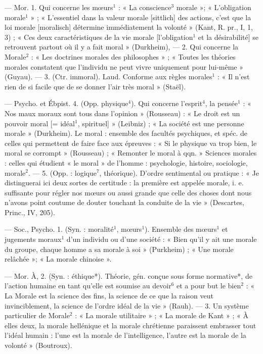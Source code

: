 \begin{itemize}[leftmargin=1cm, label=, itemsep=1pt]
 — Mor. 1. Qui concerne les
mœurs$^1$ : « La conscience$^3$ morale »;
« L'obligation morale$^1$ » ; « L’essentiel dans la valeur morale [sittlich]
des actions, c’est que la loi morale
[moralisch] détermine immédiatement la volonté » (Kant, R. pr., I,
1, 3) ; « Ces deux caractéristiques de
la vie morale [l’obligation$^1$ et la désirabilité] se retrouvent partout où il
y a fait moral » (Durkheim), — 2.
Qui concerne la Morale$^2$ : « Les doctrines morales des philosophes » ;
« Toutes les théories morales constatent que l'individu ne peut vivre
uniquement pour lui-même »
(Guyau). — 3. (Ctr. immoral).
Laud. Conforme aux règles morales$^1$ :
« Il n’est rien de si facile que de se
donner l'air très moral » (Staël).

— Psycho. et Ébpist. 4. (Opp.
physique$^4$). Qui concerne l’esprit$^4$, la
pensée$^1$ : « Nos maux moraux sont
tous dans l'opinion » (Rousseau) :
« Le droit est un pouvoir moral
[= idéal$^1$, spirituel] » (Leibniz) ; « La
société est une personne morale »
(Durkheim). Le moral : ensemble
des facultés psychiques, et spéc. de
celles qui permettent de faire face
aux épreuves : « Si le physique va
trop bien, le moral se corrompt »
(Rousseau) ; « Remonter le moral à
qqn. » Sciences morales : celles qui
étudient « le moral » de l’homme :
psychologie, histoire, sociologie,
morale$^2$. — 5. (Opp. : logique$^7$, théorique). D'ordre sentimental ou pratique : « Je distinguerai ici deux
sortes de certitude : la première est
appelée morale, i. e. suffisante pour
régler nos mœurs ou aussi grande
que celle des choses dont nous
n'avons point coutume de douter
touchant la conduite de la vie »
(Descartes, Princ., IV, 205).

 — Soc., Psycho. 1. (Syn. :
moralité$^1$, mœurs$^1$). Ensemble des
mœurs$^1$ et jugements moraux$^1$ d’un
individu ou d’une société : « Bien
qu’il y ait une morale du groupe,
chaque homme a sa morale à soi »
(Purkheim) ; « Une morale relâchée »; 
« La morale chinoise ».

— Mor. À, 2. (Syn. : éthique*).
Théorie, gén. conçue sous forme
normative*, de l’action humaine en
tant qu’elle est soumise au devoir$^6$
et a pour but le bien$^2$ : « La Morale
est la science des fins, la science de
ce que la raison veut invinciblement,
la science de l’ordre idéal de la vie »
(Rauh). — 3. Un système particulier de Morale$^2$ : « La morale utilitaire » ; « La morale de Kant » ; « À
elles deux, la morale hellénique et la
morale chrétienne paraissent embrasser tout l'idéal humain : l’une
est la morale de l'intelligence, l’autre
est la morale de la volonté » (Boutroux).


\end{itemize}
